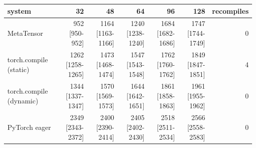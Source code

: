 \begin{tabular}{lrrrrrr}
\toprule
system & 32 & 48 & 64 & 96 & 128 & recompiles \\
\midrule
MetaTensor & 952 [950-952] & 1164 [1163-1166] & 1240 [1238-1240] & 1684 [1682-1686] & 1747 [1744-1749] & 0 \\
torch.compile (static) & 1262 [1258-1265] & 1473 [1468-1474] & 1547 [1543-1548] & 1762 [1760-1762] & 1849 [1847-1851] & 4 \\
torch.compile (dynamic) & 1344 [1337-1347] & 1570 [1569-1573] & 1644 [1642-1651] & 1861 [1858-1863] & 1961 [1955-1962] & 0 \\
PyTorch eager & 2349 [2343-2372] & 2400 [2390-2414] & 2405 [2402-2430] & 2518 [2511-2534] & 2566 [2558-2583] & 0 \\
\bottomrule
\end{tabular}
